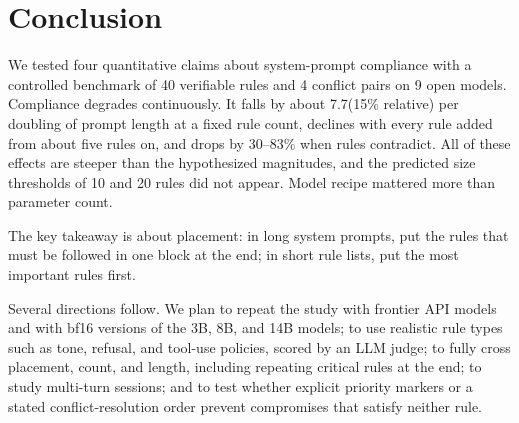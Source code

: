 \section{Conclusion}
\label{sec:conclusion}

We tested four quantitative claims about system-prompt compliance with a controlled benchmark of 40 verifiable rules and 4 conflict pairs on 9 open models.
Compliance degrades continuously.
It falls by about 7.7\pp (15\% relative) per doubling of prompt length at a fixed rule count, declines with every rule added from about five rules on, and drops by 30--83\% when rules contradict.
All of these effects are steeper than the hypothesized magnitudes, and the predicted size thresholds of 10 and 20 rules did not appear.
Model recipe mattered more than parameter count.

The key takeaway is about placement: in long system prompts, put the rules that must be followed in one block at the end; in short rule lists, put the most important rules first.

Several directions follow.
We plan to repeat the study with frontier API models and with bf16 versions of the 3B, 8B, and 14B models; to use realistic rule types such as tone, refusal, and tool-use policies, scored by an LLM judge; to fully cross placement, count, and length, including repeating critical rules at the end; to study multi-turn sessions; and to test whether explicit priority markers or a stated conflict-resolution order prevent compromises that satisfy neither rule.
